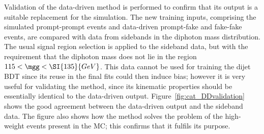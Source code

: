 
Validation of the data-driven method is performed to confirm that its output is 
a suitable replacement for the simulation.
The new training inputs, 
comprising the simulated prompt-prompt events and data-driven prompt-fake and fake-fake events, 
are compared with data from sidebands in the diphoton mass distribution.
The usual signal region selection is applied to the sideband data, 
but with the requirement that the diphoton mass does not lie in the region $115 < \mgg < \SI{135}{GeV}$.
This data cannot be used for training the dijet BDT since its reuse in the final fits 
could then induce bias; 
however it is very useful for validating the method, 
since its kinematic properties should be essentially identical to the data-driven output.
Figure~\ref{fig:cat_DDvalidation} shows the good agreement between the data-driven output
and the sideband data. 
The figure also shows how the method solves the problem of the high-weight events present in the MC; 
this confirms that it fulfils its purpose.


